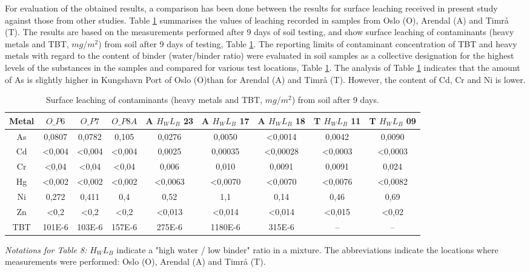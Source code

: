 \documentclass[algorithms,article,submit,pdftex,moreauthors]{Definitions/mdpi}
\begin{document}
For evaluation of the obtained results, a comparison has been done between the results for surface leaching received in present study against those from other studies. Table \ref{tab08} summarises the values of leaching recorded in samples from Oslo (O), Arendal (A) and Timrå (T). The results are based on the measurements performed after 9 days of soil testing, and show surface leaching of contaminants (heavy metals and TBT, $mg/m^2$) from soil after 9 days of testing, Table \ref{tab08}. The reporting limits of contaminant concentration of TBT and heavy metals with regard to the content of binder (water/binder ratio) were evaluated in soil samples as a collective designation for the highest levels of the substances in the samples and compared for various test locations, Table \ref{tab08}. The analysis of Table \ref{tab08} indicates that the amount of As is slightly higher in Kungshavn Port of Oslo (O)than for Arendal (A) and Timrå (T). However, the content of Cd, Cr and Ni is lower. 

\begin{table}[H] 
\begin{threeparttable}
\centering
\caption{Surface leaching of contaminants (heavy metals and TBT, $mg/m^2$) from soil after 9 days.\label{tab08}}
\small
\setlength\tabcolsep{0pt}
\begin{tabularx}{\textwidth}{@{\extracolsep{\fill}} ccccccccc }
\toprule
\textbf{Metal} & \textbf{$O\_P6$} & \textbf{$O\_P7$} & \textbf{$O\_P8A$} & \textbf{A $H_WL_B$ 23} & \textbf{A $H_WL_B$ 17} & \textbf{A $H_WL_B$ 18} & \textbf{T $H_WL_B$ 11} & \textbf{T $H_WL_B$ 09}\\
\midrule
As &  0,0807 & 0,0782 & 0,105 & 0,0276 & 0,0050 & <0,0014 & 0,0042 & 0,0090 \\
Cd & <0,004 & <0,004 & <0,004 & 0,0025 & 0,00035 & <0,00028 & <0,0003 & <0,0003 \\
Cr & <0,04 & <0,04 & <0,04 & 0,006 & 0,010 & 0,0091 & 0,0091 & 0,024 \\
Hg & <0,002 & <0,002 & <0,002 & <0,0063 & <0,0070 & <0,0070 & <0,0076 & <0,0082 \\
Ni & 0,272 & 0,411 & 0,4 & 0,52 & 1,1 & 0,14 & 0,46 & 0,69 \\
Zn & <0,2 & <0,2 & <0,2 & <0,013 & <0,014 & <0,014 & <0,015 & <0,02 \\
TBT & 101E-6 & 103E-6 & 157E-6 & 275E-6 & 1180E-6 & 315E-6 & -- & -- \\
\bottomrule
\end{tabularx}
\begin{tablenotes}
      \small
      	\item \emph{Notations for Table 8:}  $H_WL_B$ indicate a "high water / low binder" ratio in a mixture. The abbreviations indicate the locations where measurements were performed: Oslo (O), Arendal (A) and Timrå (T). 
    \end{tablenotes}
  \end{threeparttable}
\end{table}
\end{document}
